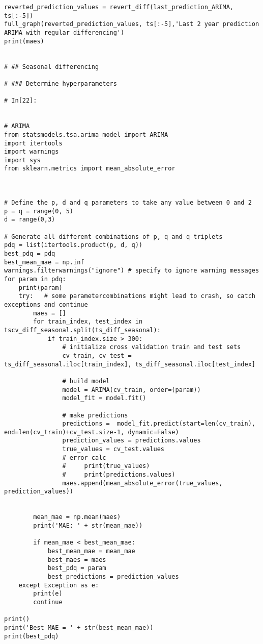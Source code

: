 \begin{verbatim}
reverted_prediction_values = revert_diff(last_prediction_ARIMA, ts[:-5])
full_graph(reverted_prediction_values, ts[:-5],'Last 2 year prediction ARIMA with regular differencing')
print(maes)


# ## Seasonal differencing

# ### Determine hyperparameters

# In[22]:


# ARIMA
from statsmodels.tsa.arima_model import ARIMA
import itertools
import warnings
import sys
from sklearn.metrics import mean_absolute_error



# Define the p, d and q parameters to take any value between 0 and 2
p = q = range(0, 5)
d = range(0,3)

# Generate all different combinations of p, q and q triplets
pdq = list(itertools.product(p, d, q))
best_pdq = pdq
best_mean_mae = np.inf
warnings.filterwarnings("ignore") # specify to ignore warning messages
for param in pdq:
    print(param)
    try:   # some parametercombinations might lead to crash, so catch exceptions and continue
        maes = []
        for train_index, test_index in tscv_diff_seasonal.split(ts_diff_seasonal):
            if train_index.size > 300:
                # initialize cross validation train and test sets
                cv_train, cv_test = ts_diff_seasonal.iloc[train_index], ts_diff_seasonal.iloc[test_index]

                # build model
                model = ARIMA(cv_train, order=(param))
                model_fit = model.fit()

                # make predictions
                predictions =  model_fit.predict(start=len(cv_train), end=len(cv_train)+cv_test.size-1, dynamic=False)
                prediction_values = predictions.values
                true_values = cv_test.values
                # error calc
                #     print(true_values)
                #     print(predictions.values)
                maes.append(mean_absolute_error(true_values, prediction_values))

        
        mean_mae = np.mean(maes)
        print('MAE: ' + str(mean_mae))    

        if mean_mae < best_mean_mae:
            best_mean_mae = mean_mae
            best_maes = maes
            best_pdq = param
            best_predictions = prediction_values
    except Exception as e:
        print(e)
        continue
   
print()
print('Best MAE = ' + str(best_mean_mae))
print(best_pdq)




\end{verbatim}
